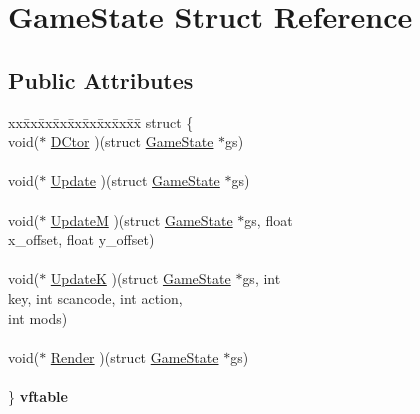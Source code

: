 \hypertarget{struct_game_state}{}\section{Game\+State Struct Reference}
\label{struct_game_state}
\subsection*{Public Attributes}
\begin{DoxyCompactItemize}
\item 
\mbox{\label{struct_game_state_aa8c33d6fc7a539d01a808c240f712ca8}} 
\begin{tabbing}
xx\=xx\=xx\=xx\=xx\=xx\=xx\=xx\=xx\=\kill
struct \{\\
\>void($\ast$ \mbox{\hyperlink{struct_game_state_a89ac5d517616efa61dc4542b99ddca55}{DCtor}} )(struct \mbox{\hyperlink{struct_game_state}{GameState}} $\ast$gs)\\
\>\\
\>void($\ast$ \mbox{\hyperlink{struct_game_state_acbaac59530e6b6281aeeb4c6054ab137}{Update}} )(struct \mbox{\hyperlink{struct_game_state}{GameState}} $\ast$gs)\\
\>\\
\>void($\ast$ \mbox{\hyperlink{struct_game_state_a8ace42db63d39c26d6a4ce6520920ed8}{UpdateM}} )(struct \mbox{\hyperlink{struct_game_state}{GameState}} $\ast$gs, float \\
\>\>x\_offset, float y\_offset)\\
\>\\
\>void($\ast$ \mbox{\hyperlink{struct_game_state_a2b9efd2a4168b1973ee002a75d8298b5}{UpdateK}} )(struct \mbox{\hyperlink{struct_game_state}{GameState}} $\ast$gs, int \\
\>\>key, int scancode, int action, \\
\>\>int mods)\\
\>\\
\>void($\ast$ \mbox{\hyperlink{struct_game_state_af9b81ae9492dd446bec0fd03db6b302a}{Render}} )(struct \mbox{\hyperlink{struct_game_state}{GameState}} $\ast$gs)\\
\>\\
\} {\bfseries vftable}\\


\end{tabbing}
\end{DoxyCompactItemize}
